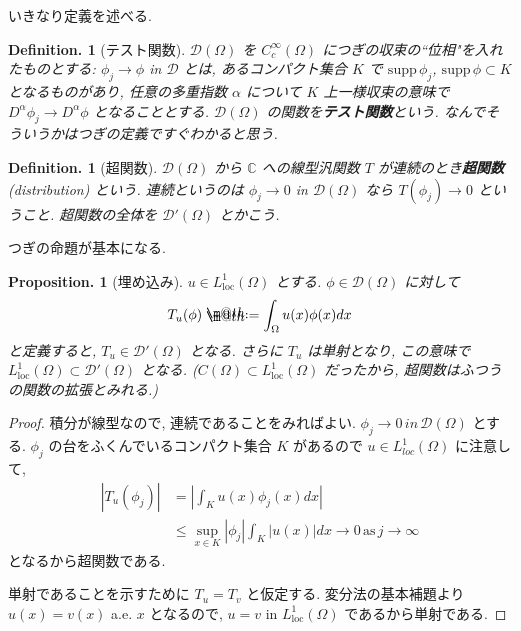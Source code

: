 \documentclass[openany, a4paper, oneside]{jsbook}
\makeatletter
\newcommand*{\defeq}{\mathrel{\rlap{%
\raisebox{0.3ex}{$\m@th\cdot$}}%
\raisebox{-0.3ex}{$\m@th\cdot$}}%
=}
\theoremstyle{break}
\newtheorem{prop}[thm]{Proposition.}
\theoremstyle{breakdefn}
\newtheorem{defn}[thm]{Definition.}
\newcommand{\abs}[1]{\left|#1\right|}
\newcommand{\Loneloc}{L_{\mathrm{loc}}^1}
\newcommand{\supp}{\mathrm{supp} \,}
\makeatother
\begin{document}
いきなり定義を述べる.
\begin{defn}[テスト関数]
 $\mathcal{D}(\Omega)$ を $C_c^{\infty}(\Omega)$ につぎの収束の``位相"を入れたものとする:
 $\phi_j \to \phi$ in $\mathcal{D}$ とは,
 あるコンパクト集合 $K$ で $\supp \phi_j$, $\supp  \phi \subset K$ となるものがあり,
 任意の多重指数 $\alpha$ について $K$ 上一様収束の意味で $D^{\alpha}\phi_j \to D^{\alpha}\phi$ となることとする.
 $\mathcal{D}(\Omega)$ の関数を\textbf{テスト関数}という.
 なんでそういうかはつぎの定義ですぐわかると思う.
\end{defn}
\begin{defn}[超関数]
 $\mathcal{D}(\Omega)$ から $\mathbb{C}$ への線型汎関数
 $T$ が連続のとき\textbf{超関数}(distribution) という.
 連続というのは $\phi_j \to  0$ in $\mathcal{D}(\Omega)$ なら
 $T (\phi_j) \to 0$ ということ.
 超関数の全体を $\mathcal{D}'(\Omega)$ とかこう.
\end{defn}
つぎの命題が基本になる.
\begin{prop}[埋め込み]
 $u \in \Loneloc (\Omega)$ とする.
 $\phi \in \mathcal{D}(\Omega)$ に対して
 \begin{equation}
  T_u (\phi)
  \defeq
  \int_{\Omega}u (x)\phi (x) dx
 \end{equation}
 と定義すると, $T_u \in \mathcal{D}'(\Omega)$ となる.
 さらに $T_u$ は単射となり, この意味で $\Loneloc (\Omega) \subset \mathcal{D}'(\Omega)$ となる.
 ($C (\Omega) \subset \Loneloc (\Omega)$ だったから, 超関数はふつうの関数の拡張とみれる.)
\end{prop}
\begin{proof}
積分が線型なので, 連続であることをみればよい.
$\phi_j \to 0 \, in \, \mathcal{D}(\Omega)$ とする.
$\phi_j$ の台をふくんでいるコンパクト集合 $K$ があるので $u \in L_{loc}^1 (\Omega)$ に注意して,
\begin{equation}
 \begin{split}
  \abs{T_u (\phi_j)}
  &=
  \abs{\int_K u (x)\phi_j (x) dx} \\
  &\le
  \sup_{x \in K} \abs{\phi_j} \int_K \abs{u(x)} dx \to 0 \, \mathrm{as} \, j \to \infty
 \end{split}
\end{equation}
となるから超関数である.

単射であることを示すために $T_u = T_v$ と仮定する.
変分法の基本補題より $u (x ) = v (x)$ a.e. $x$ となるので,
$u = v$ in $\Loneloc (\Omega)$ であるから単射である.
\end{proof}
\end{document}
